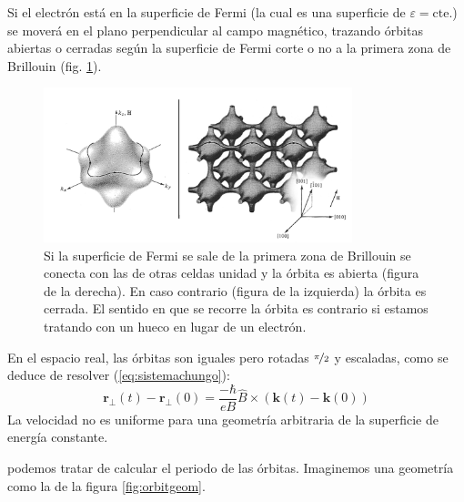 Si el electrón está en la superficie de Fermi (la cual es una
superficie de $\varepsilon = \text{cte.}$) se moverá en el plano
perpendicular al campo magnético, trazando órbitas abiertas o cerradas
según la superficie de Fermi corte o no a la primera zona de Brillouin
(fig. \ref{fig:fermiorbits}).

\begin{figure}
  \centering
  \includegraphics[width=0.8\textwidth]{figures/fermiorbits.png}
  \caption{Si la superficie de Fermi se sale de la primera zona de
    Brillouin se conecta con las de otras celdas unidad y la órbita es
    abierta (figura de la derecha). En caso contrario (figura de la
    izquierda) la órbita es cerrada.
    El sentido en que se recorre la órbita es contrario si estamos
    tratando con un hueco en lugar de un electrón. }
  \label{fig:fermiorbits}
\end{figure}

En el espacio real, las órbitas son iguales pero rotadas
$\nicefrac{\pi}{2}$ y escaladas, como se deduce de resolver (\ref{eq:sistemachungo}):
\begin{equation}
  \mathbf{r}_\perp (t) - \mathbf{r}_\perp (0) = \frac{-\hbar}{e B}
  \hat{B} \times (\mathbf{k}(t) - \mathbf{k}(0))
\end{equation}
La velocidad no es uniforme para una geometría arbitraria de la
superficie de energía constante.

podemos tratar de calcular el periodo de las órbitas. Imaginemos una
geometría como la de la figura \ref{fig:orbitgeom}.

